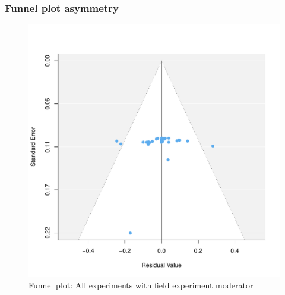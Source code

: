 \documentclass[usenames,dvipsnames]{beamer}
\begin{document}

\begin{frame}[label=supplemental]
\frametitle{Funnel plot asymmetry}

\begin{figure}[!hb]
\vspace*{-3mm}
\includegraphics[scale = 0.45]{../figs/funnel_all_mod.pdf}
\vspace{-0.2cm}
\caption{Funnel plot: All experiments with field experiment moderator}
\small
\vspace{-0.5cm}
\label{fig: funnel_all}
\end{figure}
\end{frame}

\end{document}
